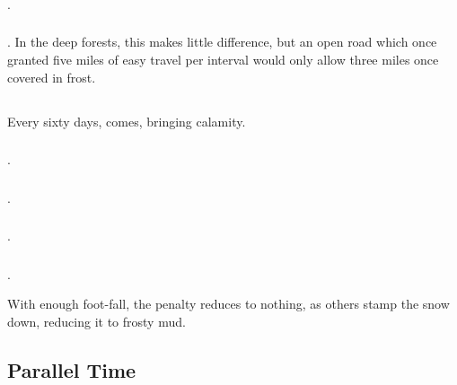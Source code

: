 \begin{multicols}{2}
\subsubsection{}
.

\subsubsection{}
.
In the deep forests, this makes little difference, but an open road which once granted five miles of easy travel per \gls{interval} would only allow three miles once covered in frost.

\subsection{}

Every sixty days,  comes, bringing calamity.

\subsubsection{}
.

\subsubsection{}
.

\subsubsection{}
.

\subsubsection{}
.

With enough foot-fall, the penalty reduces to nothing, as others stamp the snow down, reducing it to frosty mud.


\subsection{Parallel Time}


\end{multicols}
